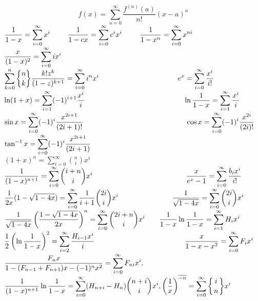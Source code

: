\def\Subset#1#2{ \bigg\{{#1 \atop #2} \bigg\}}
\def\subset#1#2{ \big\{{#1 \atop #2} \big\}}
\def\Cycle#1#2{ \bigg[{#1 \atop #2} \bigg]}
\def\cycle#1#2{ \big[{#1 \atop #2} \big]}

$$f(x)=\sum _{n=0}^{\infty }{\frac {f^{(n)}(a)}{n!}}(x-a)^{n}$$
${\displaystyle {1 \over 1 - x}=\sum_{i=0}^\infty x^i}$~~~~
${\displaystyle {1 \over 1 - c x}=\sum_{i=0}^\infty c^i x^i}$~~~~
${\displaystyle {1 \over 1 - x^n}=\sum_{i=0}^\infty x^{ni}}$~~~~
${\displaystyle {x \over (1 - x)^2}=\sum_{i=0}^\infty i x^i}$\\
${\displaystyle\sum_{k=0}^n {n \brace k} {k! z^k \over (1-z)^{k+1}}=\sum_{i=0}^\infty i^n x^i}$~~~~~~~~~~~~~~~~~~~~~
${\displaystyle e^x=\sum_{i=0}^\infty {x^i \over i!}}$\\
${\displaystyle \ln (1 + x)=\sum_{i=1}^\infty (-1)^{i+1} {x^i \over i}}$~~~~~~~~~~~~~~~~~~~~~~~~~~~
${\displaystyle \ln {1 \over 1 - x}=\sum_{i=1}^\infty {x^i \over i}}$\\
${\displaystyle \sin x=\sum_{i=0}^\infty (-1)^i {x^{2i+1} \over (2i+1)!}}$~~~~~~~~~~~~~~~~~~~~~~~~~~~~
${\displaystyle \cos x=\sum_{i=0}^\infty (-1)^i {x^{2i} \over (2i)!} }$\\
${\displaystyle \tan^{-1} x=\sum_{i=0}^\infty (-1)^i {x^{2i+1} \over (2i+1)} }$~~~~~~~~~~~~~~~~~~~~~~~~~
${\displaystyle (1+x)^n=\sum_{i=0}^\infty {n \choose i} x^i }$\\
${\displaystyle {1 \over (1-x)^{n+1}}=\sum_{i=0}^\infty {i+ n \choose i} x^i }$~~~~~~~~~~~~~~~~~~~~~~~~~
${\displaystyle {x \over e^x - 1}=\sum_{i=0}^\infty {b_i x^i \over i!} }$\\
${\displaystyle {1 \over 2x}(1 - \sqrt{1-4x})=\sum_{i=0}^\infty {1 \over i+1}{2i \choose i}x^i }$~~~~~~~~~~~~~~
${\displaystyle {1 \over \sqrt{1-4x}}=\sum_{i=0}^\infty {2i \choose i}x^i }$\\
${\displaystyle {1 \over \sqrt{1-4x}}\left({1 - \sqrt{1-4x} \over 2x}\right)^n=\sum_{i=0}^\infty {2i+n \choose i}x^i }$~~~
${\displaystyle {1 \over 1-x}\ln{1 \over 1- x}=\sum_{i=1}^\infty H_i x^i}$\\
${\displaystyle {1 \over 2}\left(\ln{1 \over 1- x}\right)^2=\sum_{i=2}^\infty {H_{i-1} x^i \over i}}$~~~~~~~~~~~~~~~~~~~~~~~~
${\displaystyle {x \over 1 - x - x^2}=\sum_{i=0}^\infty F_i x^i}$\\
${\displaystyle {F_n x \over 1 - (F_{n-1} + F_{n+1})x - (-1)^n x^2}=\sum_{i=0}^\infty F_{ni} x^i.}$\\
${\displaystyle {1 \over (1-x)^{n+1}}\ln{1 \over 1- x} = \sum_{i=0}^\infty (H_{n+i} - H_n) {n+i \choose i} x^i, \left({1 \over x}\right)^{\overline{-n}} = \sum_{i=0}^\infty \Subset i n x^i}$\\
